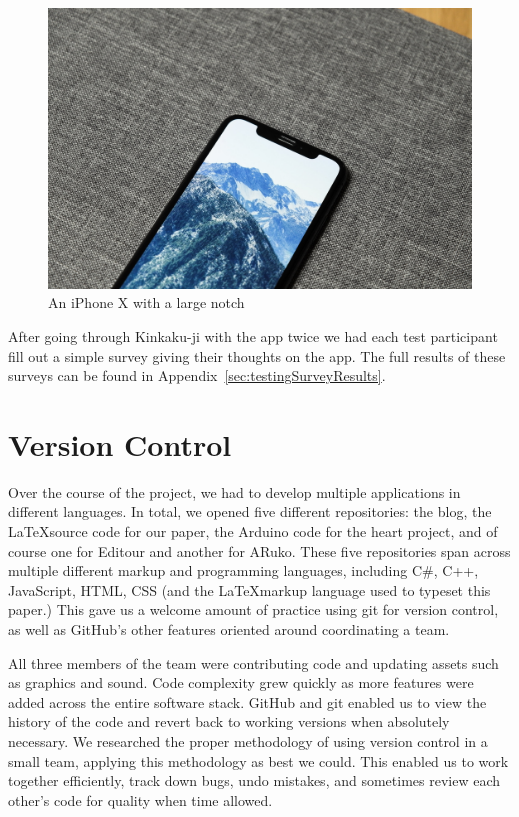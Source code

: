 \documentclass[a4paper, 10pt, american, titlepage]{article}
\begin{document}
\begin{figure}[h]
	\centering
	\includegraphics[width=\textwidth]{iphone-x.jpg}
	\caption[An iPhone X with a large notch]{An iPhone X with a large
		notch~\autocite{yoo2017}}
	\label{fig:iPhoneX}
\end{figure}

After going through Kinkaku-ji with the app twice we had each test participant
fill out a simple survey giving their thoughts on the app. The full results of
these surveys can be found in Appendix~\ref{sec:testingSurveyResults}.

\section{Version Control}
\label{sec:versionControl}

Over the course of the project, we had to develop multiple applications in
different languages. In total, we opened five different repositories: the blog,
the \LaTeX source code for our paper, the Arduino code for the heart project,
and of course one for Editour and another for ARuko. These five repositories
span across multiple different markup and programming languages, including C\#,
C++, JavaScript, HTML, CSS (and the \LaTeX markup language used to typeset this
paper.) This gave us a welcome amount of practice using git for version control,
as well as GitHub's other features oriented around coordinating a team.

All three members of the team were contributing code and updating assets such as
graphics and sound. Code complexity grew quickly as more features were added
across the entire software stack. GitHub and git enabled us to view the history
of the code and revert back to working versions when absolutely necessary. We
researched the proper methodology of using version control in a small team,
applying this methodology as best we could. This enabled us to work together
efficiently, track down bugs, undo mistakes, and sometimes review each other's
code for quality when time allowed.
\end{document}
